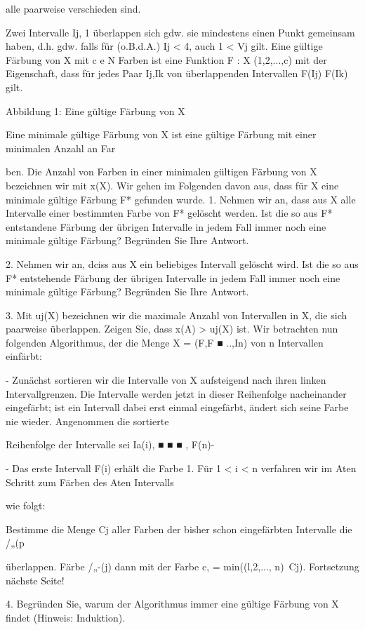 \documentclass{lehramt-informatik}
\begin{document}
\begin{enumerate}
alle paarweise verschieden sind.

Zwei Intervalle Ij, 1 überlappen sich gdw. sie mindestens einen Punkt gemeinsam haben, d.h. gdw.
falls für (o.B.d.A.) Ij < 4, auch 1 < Vj gilt. Eine gültige Färbung von X mit c e N Farben ist eine
Funktion F : X  (1,2,...,c) mit der Eigenschaft, dass für jedes Paar Ij,Ik von überlappenden
Intervallen F(Ij)  F(Ik) gilt.

Abbildung 1: Eine gültige Färbung von X

Eine minimale gültige Färbung von X ist eine gültige Färbung mit einer minimalen Anzahl an Far

ben. Die Anzahl von Farben in einer minimalen gültigen Färbung von X bezeichnen wir mit x(X).
Wir gehen im Folgenden davon aus, dass für X eine minimale gültige Färbung F* gefunden wurde.
1. Nehmen wir an, dass aus X alle Intervalle einer bestimmten Farbe von F* gelöscht werden.
Ist die so aus F* entstandene Färbung der übrigen Intervalle in jedem Fall immer noch eine
minimale gültige Färbung? Begründen Sie Ihre Antwort.

2. Nehmen wir an, dciss aus X ein beliebiges Intervall gelöscht wird. Ist die so aus F* entstehende
Färbung der übrigen Intervalle in jedem Fall immer noch eine minimale gültige Färbung?
Begründen Sie Ihre Antwort.

3. Mit uj(X) bezeichnen wir die maximale Anzahl von Intervallen in X, die sich paarweise
überlappen. Zeigen Sie, dass x(A) > uj(X) ist.
Wir betrachten nun folgenden Algorithmus, der die Menge X = (F,F ■ ..,In) von n Intervallen
einfärbt:

- Zunächst sortieren wir die Intervalle von X aufsteigend nach ihren linken Intervallgrenzen.
Die Intervalle werden jetzt in dieser Reihenfolge nacheinander eingefärbt; ist ein Intervall
dabei erst einmal eingefärbt, ändert sich seine Farbe nie wieder. Angenommen die sortierte

Reihenfolge der Intervalle sei Ia(i), ■ ■ ■ , F(n)-

- Das erste Intervall F(i) erhält die Farbe 1. Für 1 < i < n verfahren wir im Aten Schritt zum
Färben des Aten Intervalls

wie folgt:

Bestimme die Menge Cj aller Farben der bisher schon eingefärbten Intervalle die /„(p

überlappen. Färbe /„-(j) dann mit der Farbe c, = min((l,2,..., n)\ Cj).
Fortsetzung nächste Seite!

4. Begründen Sie, warum der Algorithmus immer eine gültige Färbung von X findet (Hinweis:
Induktion).


\end{enumerate}
\end{document}
